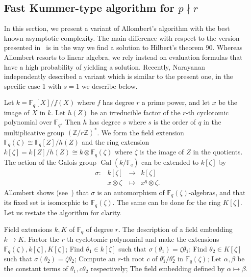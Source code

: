 \documentclass[12pt]{article}
\theoremstyle{plain}
\theoremstyle{definition}
\DeclareMathOperator{\gal}{Gal} %
\def\Z{\ensuremath{\mathbb{Z}}}
\def\F{\ensuremath{\mathbb{F}}}
\newcounter{algorithm}
\begin{document}
\subsection{Fast Kummer-type algorithm for $p \nmid r$}
\label{sec:fast-kummer}

In this section, we present a variant of Allombert's algorithm with the
best known asymptotic complexity. The main difference with respect to the 
version presented in~\cite{Allombert02} is in the way we find a solution
to Hilbert's theorem 90.
Whereas Allombert resorts to linear algebra, we rely instead on evaluation
formulas that have a high probability of yielding a solution.
Recently, Narayanan~\cite[Sec.~3]{narayanan2016fast} independently described 
a variant which is similar to the present one, in the specific case 1 with $s=1$ 
we describe below.

Let $k=\F_q[X]/f(X)$ where $f$ has degree $r$ a prime power, and let $x$ be the image of $X$ in $k$.
Let $h(Z)$ be an 
irreducible factor of the $r$-th cyclotomic polynomial over $\F_q$. Then $h$ has degree $s$ where 
$s$ is the order of $q$ in the multiplicative group $(\Z/r\Z)^\ast$. We form the field extension
$\F_q(\zeta) \cong \F_q[Z] / h(Z)$ and the ring extension $k[\zeta] = k[Z] / h(Z) \cong k \otimes
\F_q(\zeta)$ where $\zeta$ is the image of $Z$ in the quotients. The action of the Galois group
$\gal(k / \F_q)$ can be extended to $k[\zeta]$ by
\[
\begin{array}{llll}
\sigma: & k[\zeta] & \rightarrow & k[\zeta] \\
& x \otimes \zeta & \mapsto & x^q \otimes \zeta.
\end{array}
\]
Allombert shows (see~\cite[Prop.~3.2]{Allombert02}) that $\sigma$ is
an automorphism of $\F_q(\zeta)$-algebras, and that its fixed set is
isomorphic to $\F_q(\zeta)$.
The same can be done for the ring $K[\zeta]$.
Let us restate the algorithm for clarity.

\begin{algorithm}
	\begin{algorithmic}[1]
		\REQUIRE Field extensions $k, K$ of $\F_q$ of degree $r$.
		\ENSURE The description of a field embedding $k\to K$.
		\STATE Factor the $r$-th cyclotomic polynomial and make the extensions $\F_q(\zeta), 
		k[\zeta], K[\zeta]$;
		\STATE Find $\theta_1 \in k[\zeta]$ such that $\sigma(\theta_1) = \zeta\theta_1$;
		\STATE Find $\theta_2 \in K[\zeta]$ such that $\sigma(\theta_2) = \zeta\theta_2$;
		\STATE Compute an $r$-th root $c$ of $\theta_1^r / \theta_2^r$ in $\F_q(\zeta)$;
		\STATE Let $\alpha, \beta$ be the constant terms of $\theta_1, c\theta_2$ respectively;
		\RETURN The field embedding defined by $\alpha\mapsto\beta$.
	\end{algorithmic}
        \label{alog:allombert}
\end{algorithm}
\end{document}
